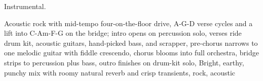 
\begin{notes}
Instrumental.
\end{notes}
\begin{prompt}
Acoustic rock with mid-tempo four-on-the-floor drive, A-G-D verse cycles and a lift into C-Am-F-G on the bridge; intro opens on percussion solo, verses ride drum kit, acoustic guitars, hand-picked bass, and scrapper, pre-chorus narrows to one melodic guitar with fiddle crescendo, chorus blooms into full orchestra, bridge strips to percussion plus bass, outro finishes on drum-kit solo, Bright, earthy, punchy mix with roomy natural reverb and crisp transients, rock, acoustic
\end{prompt}

